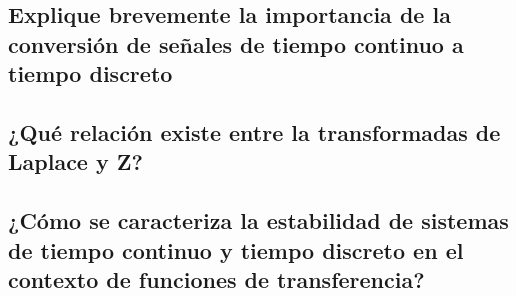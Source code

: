 \subsection{Explique brevemente la importancia de la conversión de señales de tiempo continuo a tiempo discreto}
\subsection{¿Qué relación existe entre la transformadas de Laplace y Z?}
\subsection{¿Cómo se caracteriza la estabilidad de sistemas de tiempo continuo y tiempo discreto en el contexto de funciones de transferencia?}
